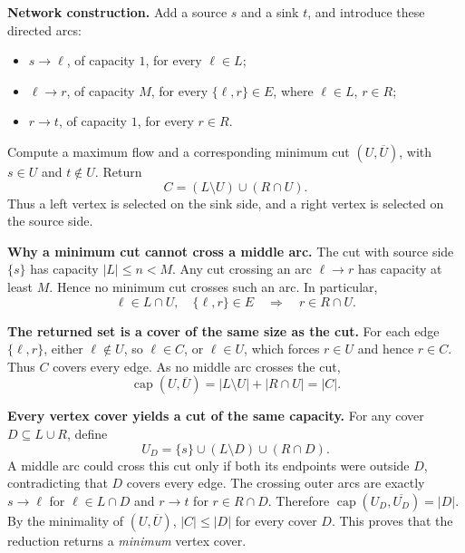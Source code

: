\documentclass[11pt]{article}
\newcommand{\capc}{\operatorname{cap}}
\begin{document}
\textbf{Network construction.}
Add a source $s$ and a sink $t$, and introduce these directed arcs:
\begin{itemize}
 \item $s\to\ell$, of capacity $1$, for every $\ell\in L$;
 \item $\ell\to r$, of capacity $M$, for every $\{\ell,r\}\in E$,
       where $\ell\in L$, $r\in R$;
 \item $r\to t$, of capacity $1$, for every $r\in R$.
\end{itemize}
\begin{center}
\end{center}
Compute a maximum flow and a corresponding minimum cut
$(U,\overline U)$, with $s\in U$ and $t\notin U$.
Return
\[
 \boxed{C=(L\setminus U)\cup(R\cap U).}
\]
Thus a left vertex is selected on the sink side, and a right vertex
is selected on the source side.

\textbf{Why a minimum cut cannot cross a middle arc.}
The cut with source side $\{s\}$ has capacity $|L|\le n<M$.
Any cut crossing an arc $\ell\to r$ has capacity at least $M$.
Hence no minimum cut crosses such an arc. In particular,
\[
 \ell\in L\cap U,\quad \{\ell,r\}\in E
 \quad\Longrightarrow\quad r\in R\cap U.
\]

\textbf{The returned set is a cover of the same size as the cut.}
For each edge $\{\ell,r\}$, either $\ell\notin U$, so $\ell\in C$,
or $\ell\in U$, which forces $r\in U$ and hence $r\in C$.
Thus $C$ covers every edge. As no middle arc crosses the cut,
\[
 \capc(U,\overline U)
 =|L\setminus U|+|R\cap U|=|C|.
\]

\textbf{Every vertex cover yields a cut of the same capacity.}
For any cover $D\subseteq L\cup R$, define
\[
 U_D=\{s\}\cup(L\setminus D)\cup(R\cap D).
\]
A middle arc could cross this cut only if both its endpoints were
outside $D$, contradicting that $D$ covers every edge.
The crossing outer arcs are exactly $s\to\ell$ for $\ell\in L\cap D$
and $r\to t$ for $r\in R\cap D$. Therefore
$\capc(U_D,\overline{U_D})=|D|$.
By the minimality of $(U,\overline U)$, $|C|\le|D|$ for every cover
$D$. This proves that the reduction returns a \emph{minimum} vertex cover.
\end{document}

